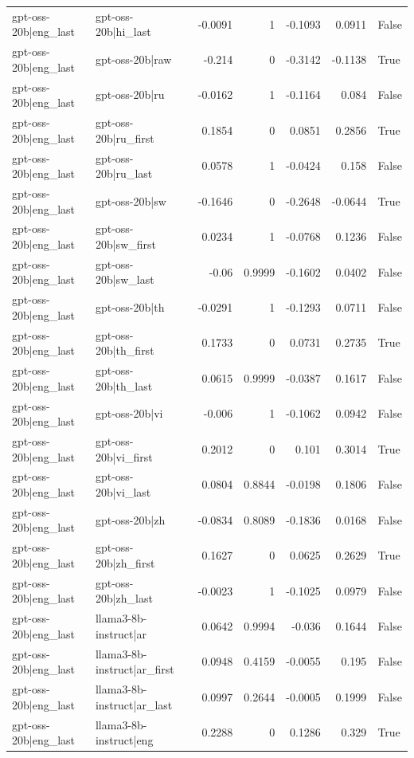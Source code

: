 \begin{table}
\begin{tabular}{l l r r r r l}
gpt-oss-20b|eng_last & gpt-oss-20b|hi_last & -0.0091 & 1 & -0.1093 & 0.0911 & False \\
gpt-oss-20b|eng_last & gpt-oss-20b|raw & -0.214 & 0 & -0.3142 & -0.1138 & True \\
gpt-oss-20b|eng_last & gpt-oss-20b|ru & -0.0162 & 1 & -0.1164 & 0.084 & False \\
gpt-oss-20b|eng_last & gpt-oss-20b|ru_first & 0.1854 & 0 & 0.0851 & 0.2856 & True \\
gpt-oss-20b|eng_last & gpt-oss-20b|ru_last & 0.0578 & 1 & -0.0424 & 0.158 & False \\
gpt-oss-20b|eng_last & gpt-oss-20b|sw & -0.1646 & 0 & -0.2648 & -0.0644 & True \\
gpt-oss-20b|eng_last & gpt-oss-20b|sw_first & 0.0234 & 1 & -0.0768 & 0.1236 & False \\
gpt-oss-20b|eng_last & gpt-oss-20b|sw_last & -0.06 & 0.9999 & -0.1602 & 0.0402 & False \\
gpt-oss-20b|eng_last & gpt-oss-20b|th & -0.0291 & 1 & -0.1293 & 0.0711 & False \\
gpt-oss-20b|eng_last & gpt-oss-20b|th_first & 0.1733 & 0 & 0.0731 & 0.2735 & True \\
gpt-oss-20b|eng_last & gpt-oss-20b|th_last & 0.0615 & 0.9999 & -0.0387 & 0.1617 & False \\
gpt-oss-20b|eng_last & gpt-oss-20b|vi & -0.006 & 1 & -0.1062 & 0.0942 & False \\
gpt-oss-20b|eng_last & gpt-oss-20b|vi_first & 0.2012 & 0 & 0.101 & 0.3014 & True \\
gpt-oss-20b|eng_last & gpt-oss-20b|vi_last & 0.0804 & 0.8844 & -0.0198 & 0.1806 & False \\
gpt-oss-20b|eng_last & gpt-oss-20b|zh & -0.0834 & 0.8089 & -0.1836 & 0.0168 & False \\
gpt-oss-20b|eng_last & gpt-oss-20b|zh_first & 0.1627 & 0 & 0.0625 & 0.2629 & True \\
gpt-oss-20b|eng_last & gpt-oss-20b|zh_last & -0.0023 & 1 & -0.1025 & 0.0979 & False \\
gpt-oss-20b|eng_last & llama3-8b-instruct|ar & 0.0642 & 0.9994 & -0.036 & 0.1644 & False \\
gpt-oss-20b|eng_last & llama3-8b-instruct|ar_first & 0.0948 & 0.4159 & -0.0055 & 0.195 & False \\
gpt-oss-20b|eng_last & llama3-8b-instruct|ar_last & 0.0997 & 0.2644 & -0.0005 & 0.1999 & False \\
gpt-oss-20b|eng_last & llama3-8b-instruct|eng & 0.2288 & 0 & 0.1286 & 0.329 & True \\

\end{tabular}
\end{table}
